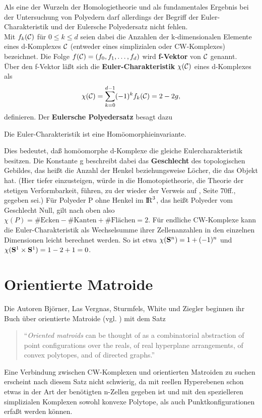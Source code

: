 Als eine der Wurzeln der Homologietheorie und als fundamentales Ergebnis bei
der Untersuchung von Polyedern darf allerdings der Begriff der
Euler-Charakteristik und der Eulersche Polyedersatz
 nicht fehlen.\\
Mit $f_k(\cal C)$ für $0\leq k\leq d$ seien dabei die Anzahlen der
k-dimensionalen Elemente eines d-Komplexes $\cal C$ (entweder eines simplizialen
oder CW-Komplexes) bezeichnet. Die Folge $f({\cal C})=(f_0,f_1,\ldots,f_d)$
wird {\bf f-Vektor} von $\cal C$ genannt.\\
Über den f-Vektor läßt sich die {\bf Euler-Charakteristik} $\chi(\cal C)$
eines d-Komplexes als
$$ \chi({\cal C}) = \sum\limits_{k=0}^{d-1} (-1)^k f_k({\cal C})=2-2g, $$
definieren. Der {\bf Eulersche Polyedersatz} besagt dazu
\begin{satz}
Die Euler-Charakteristik ist eine Homöomorphieinvariante.
\end{satz}
Dies bedeutet, daß homöomorphe d-Komplexe die gleiche Eulercharakteristik
besitzen. Die Konstante g beschreibt dabei das {\bf Geschlecht} des
 topologischen Gebildes, das heißt die Anzahl der Henkel
beziehungsweise Löcher, die das Objekt hat. (Hier tiefer einzusteigen, würde
in die Homotopietheorie, die Theorie der stetigen Verformbarkeit, führen, zu
der wieder der Verweis auf \cite{Os:92}, Seite 70ff., gegeben sei.)
Für Polyeder P ohne Henkel im $\R^3$, das heißt Polyeder vom Geschlecht
Null, gilt nach oben also
$\chi(P)=\#\mbox{Ecken}-\#\mbox{Kanten}+\#\mbox{Flächen}=2$.
Für endliche CW-Komplexe kann die Euler-Charakteristik als
Wechselsumme ihrer Zellenanzahlen in den einzelnen Dimensionen leicht
berechnet werden. So ist etwa $\chi(\S^n) = 1 + (-1)^n$ und
$\chi(\S^1\times\S^1) = 1 - 2 + 1 = 0$.

\section{Orientierte Matroide}

Die Autoren Björner, Las Vergnas, Sturmfels, White und Ziegler beginnen ihr
Buch über orientierte Matroide (vgl. \cite{Bj:93}) mit dem Satz
\begin{quote}{\sf
"`{\it Oriented matroids} can be thought of as a combinatorial abstraction
of point configurations over the reals, of real hyperplane arrangements, of
convex polytopes, and of directed graphs."'
}\end{quote}
Eine Verbindung zwischen CW-Komplexen und orientierten Matroiden zu suchen
erscheint nach diesem Satz nicht schwierig, da mit reellen Hyperebenen schon
etwas in der Art der benötigten n-Zellen gegeben ist und mit den spezielleren
simplizialen Komplexen sowohl konvexe Polytope, als auch Punktkonfigurationen
erfaßt werden können.

